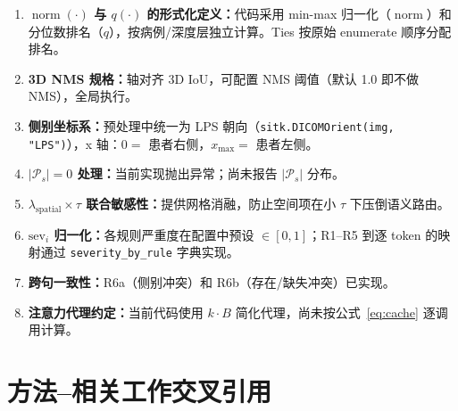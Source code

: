\documentclass[11pt,a4paper]{article}
\newcommand{\normop}{\operatorname{norm}}
\theoremstyle{definition}
\begin{document}
\begin{enumerate}[label=$\square$]
    \item[\checkmark] \textbf{$\normop(\cdot)$ 与 $q(\cdot)$ 的形式化定义：}代码采用 min-max 归一化（$\normop$）和分位数排名（$q$），按病例/深度层独立计算。Ties 按原始 enumerate 顺序分配排名。
    \item[\checkmark] \textbf{3D NMS 规格：}轴对齐 3D IoU，可配置 NMS 阈值（默认 1.0 即不做 NMS），全局执行。
    \item[\checkmark] \textbf{侧别坐标系：}预处理中统一为 LPS 朝向（\texttt{sitk.DICOMOrient(img, "LPS")}），x 轴：$0=$ 患者右侧，$x_{\max}=$ 患者左侧。
    \item[$\square$] \textbf{$|\mathcal{P}_s|=0$ 处理：}当前实现抛出异常；尚未报告 $|\mathcal{P}_s|$ 分布。
    \item[$\square$] \textbf{$\lambda_{\mathrm{spatial}} \times \tau$ 联合敏感性：}提供网格消融，防止空间项在小 $\tau$ 下压倒语义路由。
    \item[\checkmark] \textbf{$\mathrm{sev}_i$ 归一化：}各规则严重度在配置中预设 $\in [0,1]$；R1--R5 到逐 token 的映射通过 \texttt{severity\_by\_rule} 字典实现。
    \item[\checkmark] \textbf{跨句一致性：}R6a（侧别冲突）和 R6b（存在/缺失冲突）已实现。
    \item[$\square$] \textbf{注意力代理约定：}当前代码使用 $k \cdot B$ 简化代理，尚未按公式~\eqref{eq:cache} 逐调用计算。
\end{enumerate}


\section{方法--相关工作交叉引用}
\end{document}
